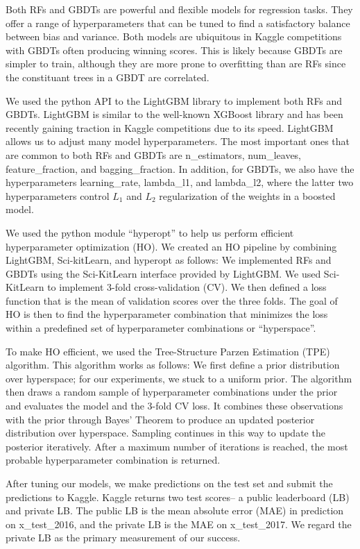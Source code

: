\documentclass[12pt]{article}
\begin{document}
Both RFs and GBDTs are powerful and flexible models for regression tasks. They offer a range of hyperparameters that can be tuned to find a satisfactory balance between bias and variance. Both models are ubiquitous in Kaggle competitions with GBDTs often producing winning scores. This is likely because GBDTs are simpler to train, although they are more prone to overfitting than are RFs since the constituant trees in a GBDT are correlated.

We used the python API to the LightGBM library to implement both RFs and GBDTs. LightGBM is similar to the well-known XGBoost library and has been recently gaining traction in Kaggle competitions due to its speed. LightGBM allows us to adjust many model hyperparameters. The most important ones that are common to both RFs and GBDTs are n\_estimators, num\_leaves, feature\_fraction, and bagging\_fraction. In addition, for GBDTs, we also have the hyperparameters learning\_rate, lambda\_l1, and lambda\_l2, where the latter two hyperparameters control $L_1$ and $L_2$ regularization of the weights in a boosted model.

We used the python module ``hyperopt'' to help us perform efficient hyperparameter optimization (HO). We created an HO pipeline by combining LightGBM, Sci-kitLearn, and hyperopt as follows: We implemented RFs and GBDTs using the Sci-KitLearn interface provided by LightGBM. We used Sci-KitLearn to implement 3-fold cross-validation (CV). We then defined a loss function that is the mean of validation scores over the three folds. The goal of HO is then to find the hyperparameter combination that minimizes the loss within a predefined set of hyperparameter combinations or ``hyperspace''.

To make HO efficient, we used the Tree-Structure Parzen Estimation (TPE) algorithm. This algorithm works as follows: We first define a prior distribution over hyperspace; for our experiments, we stuck to a uniform prior. The algorithm then draws a random sample of hyperparameter combinations under the prior and evaluates the model and the 3-fold CV loss. It combines these observations with the prior through Bayes' Theorem to produce an updated posterior distribution over hyperspace. Sampling continues in this way to update the posterior iteratively. After a maximum number of iterations is reached, the most probable hyperparameter combination is returned.

After tuning our models, we make predictions on the test set and submit the predictions to Kaggle. Kaggle returns two test scores-- a public leaderboard (LB) and private LB. The public LB is the mean absolute error (MAE) in prediction on x\_test\_2016, and the private LB is the MAE on x\_test\_2017. We regard the private LB as the primary measurement of our success.
\end{document}
